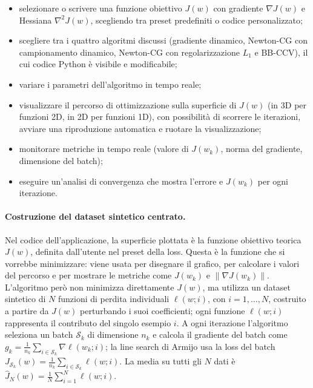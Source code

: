 \documentclass[a4paper,12pt]{article}
\numberwithin{equation}{section}
\numberwithin{figure}{section}
\numberwithin{table}{section}
\begin{document}
\begin{itemize}
  \item selezionare o scrivere una funzione obiettivo $J(w)$ con gradiente
  $\nabla J(w)$ e Hessiana $\nabla^2 J(w)$, scegliendo tra preset predefiniti
  o codice personalizzato;
  \item scegliere tra i quattro algoritmi discussi (gradiente dinamico,
  Newton-CG con campionamento dinamico, Newton-CG con regolarizzazione
  $L_1$ e BB-CCV), il cui codice Python è visibile e modificabile;
  \item variare i parametri dell'algoritmo in tempo reale;
  \item visualizzare il percorso di ottimizzazione sulla superficie di
  $J(w)$ (in 3D per funzioni 2D, in 2D per funzioni 1D), con possibilità di
  scorrere le iterazioni, avviare una riproduzione automatica e ruotare la
  visualizzazione;
  \item monitorare metriche in tempo reale (valore di $J(w_k)$, norma del
  gradiente, dimensione del batch);
  \item eseguire un'analisi di convergenza che mostra l'errore e $J(w_k)$
  per ogni iterazione.
\end{itemize}

\paragraph{Costruzione del dataset sintetico centrato.}
Nel codice dell'applicazione, la superficie plottata è la funzione obiettivo
teorica $J(w)$, definita dall'utente nel preset della loss. Questa è la
funzione che si vorrebbe minimizzare: viene usata per disegnare il grafico,
per calcolare i valori del percorso e per mostrare le metriche come $J(w_k)$
e $\|\nabla J(w_k)\|$. L'algoritmo però non minimizza direttamente $J(w)$,
ma utilizza un dataset sintetico di $N$ funzioni di perdita individuali
$\ell(w; i)$, con $i = 1,\dots,N$, costruito a partire da $J(w)$ perturbando
i suoi coefficienti; ogni funzione $\ell(w; i)$ rappresenta il contributo del
singolo esempio $i$. A ogni iterazione l'algoritmo seleziona un batch
$\mathcal{S}_k$ di dimensione $n_k$ e calcola il gradiente del batch come
$g_k = \frac{1}{n_k}\sum_{i \in \mathcal{S}_k}\nabla \ell(w_k; i)$; la line
search di Armijo usa la loss del batch
$J_{\mathcal{S}_k}(w) = \frac{1}{n_k}\sum_{i \in \mathcal{S}_k}\ell(w; i)$.
La media su tutti gli $N$ dati è
$\hat J_N(w) = \frac{1}{N}\sum_{i=1}^N \ell(w; i)$.
\end{document}
